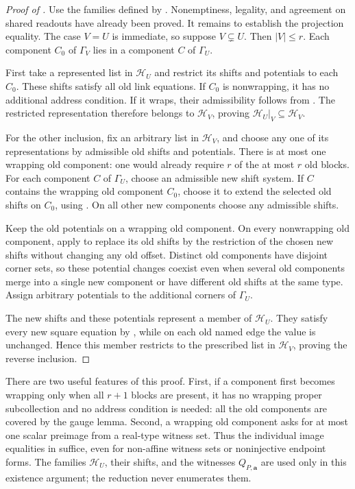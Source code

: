 \documentclass[11pt]{article}
\theoremstyle{definition}
\begin{document}
\begin{proof}[Proof of ]
Use the families defined by . Nonemptiness,
legality, and agreement on shared readouts have already been proved.
It remains to establish the projection equality. The case \(V=U\)
is immediate, so suppose \(V\subsetneq U\). Then \(\left\lvert{V}\right\rvert\le r\).
Each component \(C_0\) of \(\Gamma_V\) lies in a component \(C\) of
\(\Gamma_U\).

First take a represented list in \(\mathcal H_U\) and restrict its shifts and
potentials to each \(C_0\). These shifts satisfy all old link equations.
If \(C_0\) is nonwrapping, it has no additional address condition.
If it wraps, their admissibility follows from
. The restricted representation therefore
belongs to \(\mathcal H_V\), proving
\(\mathcal H_U|_V\subseteq\mathcal H_V\).

For the other inclusion, fix an arbitrary list in \(\mathcal H_V\), and choose
any one of its representations by admissible old shifts and potentials.
There is at most one wrapping old component: one would already require
\(r\) of the at most \(r\) old blocks.
For each component \(C\) of \(\Gamma_U\), choose an admissible new shift
system. If \(C\) contains the wrapping old component \(C_0\), choose it
to extend the selected old shifts on \(C_0\), using
. On all other new components choose any
admissible shifts.

Keep the old potentials on a wrapping old component. On every
nonwrapping old component, apply  to replace its
old shifts by the restriction of the chosen new shifts without changing
any old offset. Distinct old components have disjoint corner sets,
so these potential changes coexist even when several old components
merge into a single new component or have different old shifts at the
same type. Assign arbitrary potentials to the additional corners of
\(\Gamma_U\).

The new shifts and these potentials represent a member of \(\mathcal H_U\).
They satisfy every new square equation by
, while on each old named edge the value is
unchanged. Hence this member restricts to the prescribed list in
\(\mathcal H_V\), proving the reverse inclusion.
\end{proof}

There are two useful features of this proof. First, if a component
first becomes wrapping only when all \(r+1\) blocks are present, it has
no wrapping proper subcollection and no address condition is needed:
all the old components are covered by the gauge lemma. Second, a
wrapping old component asks for at most one scalar preimage from a
real-type witness set. Thus the individual image equalities in
 suffice, even for non-affine witness sets
or noninjective endpoint forms. The families \(\mathcal H_U\), their shifts,
and the witnesses \(Q_{P,\mathbf a}\) are used only in this existence
argument; the reduction never enumerates them.
\end{document}
